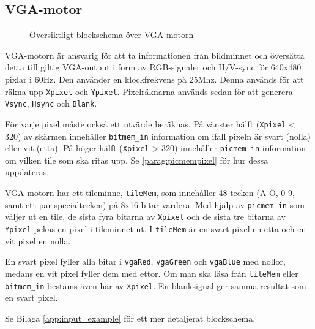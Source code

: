 \documentclass[]{article}
\begin{document}
\newpage
\subsection{VGA-motor}
\begin{figure}[h!]
	\caption{Översiktligt blockschema över VGA-motorn}
\end{figure}
\noindent
VGA-motorn är ansvarig för att ta informationen från bildminnet och översätta detta till giltig VGA-output i form av RGB-signaler och H/V-sync för 640x480 pixlar i 60Hz. Den använder en klockfrekvens på 25Mhz. Denna används för att räkna upp \texttt{Xpixel} och \texttt{Ypixel}. Pixelräknarna används sedan för att generera \texttt{Vsync}, \texttt{Hsync} och \texttt{Blank}.

För varje pixel måste också ett utvärde beräknas. På vänster hälft (\texttt{Xpixel} < 320) av skärmen innehåller \texttt{bitmem\_in} information om ifall pixeln är svart (nolla) eller vit (etta). På höger hälft (\texttt{Xpixel} > 320) innehåller \texttt{picmem\_in} information om vilken tile som ska ritas upp. Se \ref{parag:picmempixel} för hur dessa uppdateras.

VGA-motorn har ett tileminne, \texttt{tileMem}, som innehåller 48 tecken (A-Ö, 0-9, samt ett par specialtecken) på 8x16 bitar vardera. Med hjälp av \texttt{picmem\_in} som väljer ut en tile, de sista fyra bitarna av \texttt{Xpixel} och de sista tre bitarna av \texttt{Ypixel} pekas en pixel i tileminnet ut. I \texttt{tileMem} är en svart pixel en etta och en vit pixel en nolla. 

En svart pixel fyller alla bitar i \texttt{vgaRed}, \texttt{vgaGreen} och \texttt{vgaBlue} med nollor, medans en vit pixel fyller dem med ettor. Om man ska läsa från \texttt{tileMem} eller \texttt{bitmem\_in} bestäms även här av \texttt{Xpixel}. En blanksignal ger samma resultat som en svart pixel.

Se Bilaga \ref{app:input_example} för ett mer detaljerat blockschema.

\newpage
\end{document}
